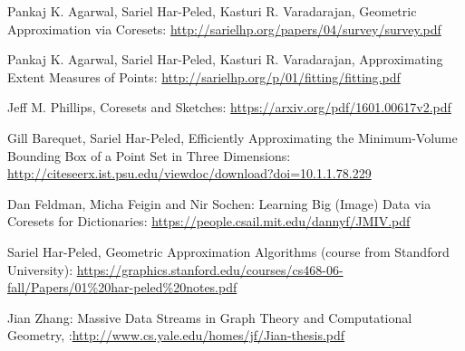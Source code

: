 \documentclass[a4paper,10pt]{article}
\begin{document}
\begin{thebibliography}{1}

 Pankaj K. Agarwal, Sariel Har-Peled, Kasturi R. Varadarajan, Geometric Approximation via Coresets: \url{http://sarielhp.org/papers/04/survey/survey.pdf}

 Pankaj K. Agarwal, Sariel Har-Peled, Kasturi R. Varadarajan, Approximating Extent Measures of Points: \url{http://sarielhp.org/p/01/fitting/fitting.pdf}


 Jeff M. Phillips, Coresets and Sketches: \url{https://arxiv.org/pdf/1601.00617v2.pdf}

 Gill Barequet, Sariel Har-Peled, Efficiently Approximating the Minimum-Volume
Bounding Box of a Point Set in Three Dimensions: \url{http://citeseerx.ist.psu.edu/viewdoc/download?doi=10.1.1.78.229}

 Dan Feldman, Micha Feigin and Nir Sochen: Learning Big (Image) Data via Coresets for Dictionaries: \url{https://people.csail.mit.edu/dannyf/JMIV.pdf}

 Sariel Har-Peled, Geometric Approximation Algorithms (course from Standford University): \url{https://graphics.stanford.edu/courses/cs468-06-fall/Papers/01%20har-peled%20notes.pdf}

 Jian Zhang: Massive Data Streams in Graph Theory and Computational Geometry, :\url{http://www.cs.yale.edu/homes/jf/Jian-thesis.pdf}


\end{thebibliography}
\end{document}
